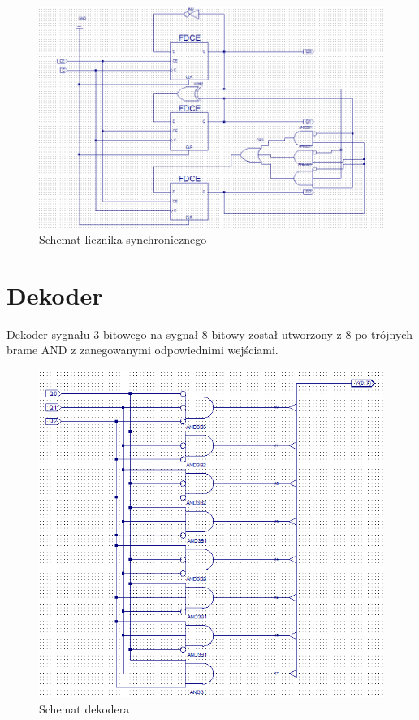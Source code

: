 \documentclass[wide,a4paper,titlepage,12pt] {article}
\begin{document}
  \begin{figure}[htbp]
    \begin{center}
      \includegraphics[scale=0.6]{licznik.png}
      \caption{Schemat licznika synchronicznego}
    \end{center}
  \end{figure}

  \newpage

  \section{Dekoder}
  Dekoder sygnału 3-bitowego na sygnał 8-bitowy został utworzony z 8 po trójnych brame AND z zanegowanymi odpowiednimi wejściami.

  \begin{figure}[htbp]
    \begin{center}
      \includegraphics[scale=0.6]{dekoder.png}
      \caption{Schemat dekodera}
    \end{center}
  \end{figure}
\end{document}
